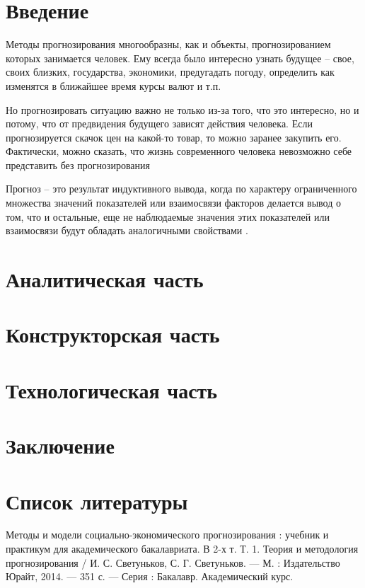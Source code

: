 \documentclass[a4paper,14pt]{extreport}
\begin{document}
	
\renewcommand{\contentsname}{Содержание}
\tableofcontents
\setcounter{page}{3}


\chapter*{Введение}

Методы прогнозирования многообразны, как и объекты, прогнозированием которых занимается человек. Ему всегда было интересно узнать будущее -- свое, своих близких, государства, экономики, предугадать погоду, определить как изменятся в ближайшее время курсы валют и т.п.

Но прогнозировать ситуацию важно не только из-за того, что это интересно, но и потому, что от предвидения будущего зависят действия человека. Если прогнозируется скачок цен на какой-то товар, то можно заранее закупить его. Фактически, можно сказать, что жизнь современного человека невозможно себе представить без прогнозирования

Прогноз -- это результат индуктивного вывода, когда по характеру ограниченного множества значений показателей или взаимосвязи факторов делается вывод о том, что и остальные, еще не наблюдаемые значения этих показателей или взаимосвязи будут обладать аналогичными свойствами \cite{hse_pred}.
	
\chapter{Аналитическая часть}



\chapter{Конструкторская часть}



\chapter{Технологическая часть}



\chapter*{Заключение}


\chapter*{Список литературы}

\begin{thebibliography}{3}
	 Методы и модели социально-экономического прогнозирования : учебник и практикум для академического бакалавриата. В 2-х т. Т. 1. Теория и методология прогнозирования / И. С. Светуньков, С. Г. Светуньков. — М. : Издательство Юрайт, 2014. — 351 с. — Серия : Бакалавр. Академический курс.
	
\end{thebibliography}
	
\end{document}
